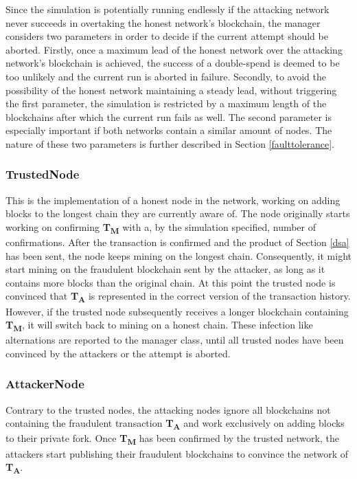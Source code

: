 \documentclass[a4paper,12pt,twoside]{report}
\begin{document}
Since the simulation is potentially running endlessly if the attacking network never succeeds in overtaking the honest network's blockchain, the manager considers two parameters in order to decide if the current attempt should be aborted. Firstly, once a maximum lead of the honest network over the attacking network's blockchain is achieved, the success of a double-spend is deemed to be too unlikely and the current run is aborted in failure. Secondly, to avoid the possibility of the honest network maintaining a steady lead, without triggering the first parameter, the simulation is restricted by a maximum length of the blockchains after which the current run fails as well.  The second parameter is especially important if both networks contain a similar amount of nodes. The nature of these two parameters is further described in Section \ref{faulttolerance}.
\subsubsection{TrustedNode}
This is the implementation of a honest node in the network, working on adding blocks to the longest chain they are currently aware of. The node originally starts working on confirming \textbf{T\textsubscript{M}} with a, by the simulation specified, number of confirmations. After the transaction is confirmed and the product of Section \ref{dsa} has been sent, the node keeps mining on the longest chain. Consequently, it might start mining on the fraudulent blockchain sent by the attacker, as long as it contains more blocks than the original chain. At this point the trusted node is convinced that \textbf{T\textsubscript{A}} is represented in the correct version of the transaction history. However, if the trusted node subsequently receives a longer blockchain containing \textbf{T\textsubscript{M}}, it will switch back to mining on a honest chain. These infection like alternations are reported to the manager class, until all trusted nodes have been convinced by the attackers or the attempt is aborted.
\subsubsection{AttackerNode}
Contrary to the trusted nodes, the attacking nodes ignore all blockchains not containing the fraudulent transaction \textbf{T\textsubscript{A}} and work exclusively on adding blocks to their private fork. Once \textbf{T\textsubscript{M}} has been confirmed by the trusted network, the attackers start publishing their fraudulent blockchains to convince the network of \textbf{T\textsubscript{A}}.
\end{document}
